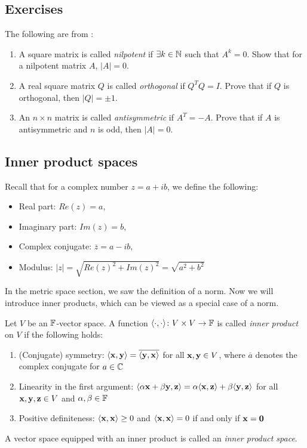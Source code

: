 \documentclass{article}
\begin{document}
\subsection{Exercises}
The following are from \cite[p.85]{linalgwrong}:
\begin{enumerate}
    \item A square matrix is called \emph{nilpotent} if $\exists k \in {\mathbb{N}}$ such that $A^k = 0$. Show that for a nilpotent matrix $A$, $|A| = 0$.
    \item A real square matrix $Q$ is called \emph{orthogonal} if $Q^T Q = I$. Prove that if $Q$ is orthogonal, then $|Q| = \pm 1$.
    \item An $n \times n$ matrix is called \emph{antisymmetric} if $A^T = -A$. Prove that if $A$ is antisymmetric and $n$ is odd, then $|A|=0$. 
\end{enumerate}

\subsection{Inner product spaces}

Recall that for a complex number $z = a + ib$, we define the following:
\begin{itemize}
\item Real part: $Re(z) = a$,
\item Imaginary part: $Im(z) = b$,
\item Complex conjugate: $\overline{z}= a -ib$, 
\item Modulus: $|z| = \sqrt{Re(z)^2 + Im(z)^2} = \sqrt{a^2 + b^2}$
\end{itemize}


In the metric space section, we saw the definition of a norm. Now we will introduce inner products, which can be viewed as a special case of a norm. 
\begin{definition}\label{def:inn_prod}
Let $V$ be an ${\mathbb{F}}$-vector space. A function $\langle \cdot,\cdot \rangle \colon V \times V \to {\mathbb{F}}$ is called \emph{inner product} on $V$ if the following holds:
\begin{enumerate}
    \item (Conjugate) symmetry: $\langle {\mathbf{x}},{\mathbf{y}} \rangle = \overline{\langle {\mathbf{y}},{\mathbf{x}} \rangle}$ for all ${\mathbf{x}},{\mathbf{y}}\in V$, where $\overline{a}$ denotes the complex conjugate for $a\in {\mathbb{C}}$
    \item Linearity in the first argument: $\langle \alpha {\mathbf{x}} + \beta {\mathbf{y}}, {\mathbf{z}} \rangle = \alpha \langle {\mathbf{x}},{\mathbf{z}} \rangle + \beta \langle {\mathbf{y}},{\mathbf{z}} \rangle$ for all ${\mathbf{x}},{\mathbf{y}},{\mathbf{z}}\in V$ and $\alpha, \beta \in {\mathbb{F}}$
    \item Positive definiteness: $\langle {\mathbf{x}},{\mathbf{x}} \rangle \geq 0$ and $\langle {\mathbf{x}},{\mathbf{x}} \rangle = 0$ if and only if ${\mathbf{x}} = {\mathbf{0}}$ 
\end{enumerate}
A vector space equipped with an inner product is called an \emph{inner product space}.
\end{definition}
\end{document}
